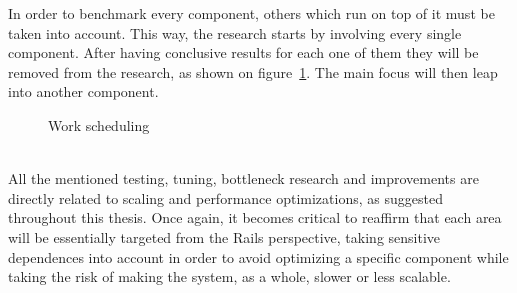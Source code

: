 In order to benchmark every component, others which run on top of it must be taken into account. This way, the research starts by involving every single component. After having conclusive results for each one of them they will be removed from the research, as shown on figure~\ref{fig:gantt}. The main focus will then leap into another component.
\begin{figure}[th]
  \begin{center}
    \leavevmode
 
 
    \caption{Work scheduling}
    \label{fig:gantt}
  \end{center}
\end{figure}\\
All the mentioned testing, tuning, bottleneck research and improvements are directly related to scaling and performance optimizations, as suggested throughout this thesis.
Once again, it becomes critical to reaffirm that each area will be essentially targeted from the Rails perspective, taking sensitive dependences into account in order to avoid optimizing a specific component while taking the risk of making the system, as a whole, slower or less scalable.

